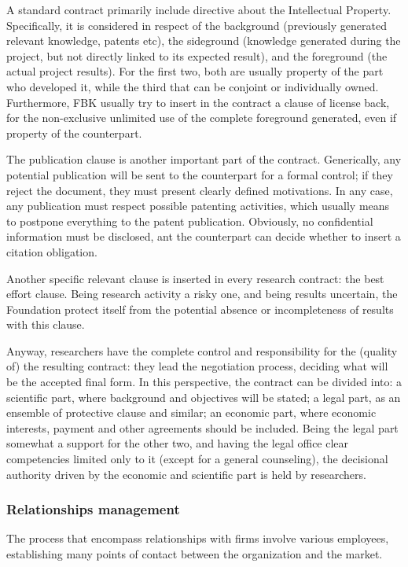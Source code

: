 A standard contract primarily include directive about the Intellectual Property. Specifically, it is considered in respect of the background (previously generated relevant knowledge, patents etc), the sideground (knowledge generated during the project, but not directly linked to its expected result), and the foreground (the actual project results). For the first two, both are usually property of the part who developed it, while the third that can be conjoint or individually owned. Furthermore, FBK usually try to insert in the contract a clause of license back, for the non-exclusive unlimited use of the complete foreground generated, even if property of the counterpart.

The publication clause is another important part of the contract. Generically, any potential publication will be sent to the counterpart for a formal control; if they reject the document, they must present clearly defined motivations. In any case, any publication must respect possible patenting activities, which usually means to postpone everything to the patent publication. Obviously, no confidential information must be disclosed, ant the counterpart can decide whether to insert a citation obligation. 

Another specific relevant clause is inserted in every research contract: the best effort clause. Being research activity a risky one, and being results uncertain, the Foundation protect itself from the potential absence or incompleteness of results with this clause.  

Anyway, researchers have the complete control and responsibility for the (quality of) the resulting contract: they lead the negotiation process, deciding what will be the accepted final form. In this perspective, the contract can be divided into: a scientific part, where background and objectives will be stated; a legal part, as an ensemble of protective clause and similar; an economic part, where economic interests, payment and other agreements should be included. Being the legal part somewhat a support for the other two, and having the legal office clear competencies limited only to it (except for a general counseling), the decisional authority driven by the economic and scientific part is held by researchers.

\subsubsection{Relationships management}

The process that encompass relationships with firms involve various employees, establishing many points of contact between the organization and the market.


